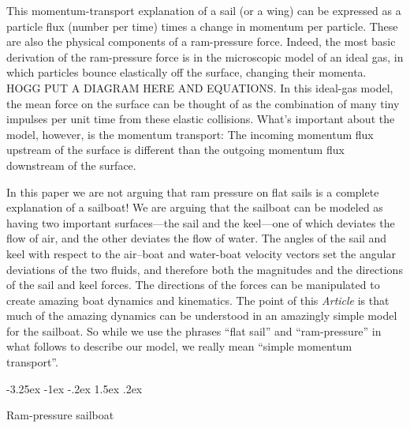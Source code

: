 \documentclass[letterpaper]{article}
\makeatletter
\newcommand{\documentname}{\textsl{Article}}
\renewcommand\section{\@startsection {section}{1}{\z@}%
  {-3.25ex \@plus -1ex \@minus -.2ex}%
  {1.5ex \@plus .2ex}%
  {\raggedright\normalfont\large\bfseries}}
\makeatother
\begin{document}
This momentum-transport explanation of a sail (or a wing) 
can be expressed as a particle flux (number per time) times a change in momentum per particle.
These are also the physical components of a ram-pressure force.
Indeed, the most basic derivation of the ram-pressure force is in the microscopic model of an ideal gas, in which particles bounce elastically off the surface, changing their momenta.
HOGG PUT A DIAGRAM HERE AND EQUATIONS.
In this ideal-gas model, the mean force on the surface can be thought of as the combination of many tiny impulses per unit time from these elastic collisions.
What's important about the model, however, is the momentum transport:
The incoming momentum flux upstream of the surface is different than the outgoing momentum flux downstream of the surface.

In this paper we are not arguing that ram pressure on flat sails is a complete explanation of a sailboat!
We are arguing that the sailboat can be modeled as having two important surfaces---the sail and the keel---one of which deviates the flow of air, and the other deviates the flow of water.
The angles of the sail and keel with respect to the air--boat and water-boat velocity vectors set the angular deviations of the two fluids, and therefore both the magnitudes and the directions of the sail and keel forces.
The directions of the forces can be manipulated to create amazing boat dynamics and kinematics.
The point of this \documentname{} is that much of the amazing dynamics can be understood in an amazingly simple model for the sailboat.
So while we use the phrases ``flat sail'' and ``ram-pressure'' in what follows to describe our model, we really mean ``simple momentum transport''.

\section{Ram-pressure sailboat}\label{sec:model}
\end{document}
